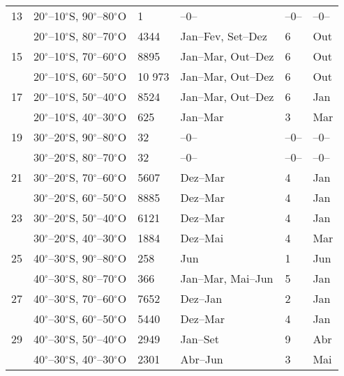 \begin{table}[!ht]
\begin{tabularx}{\textwidth}{p{0.6cm} p{3.5cm} W W W W}
13&20$^{\circ}$--10$^{\circ}$S, 90$^{\circ}$--80$^{\circ}$O& 1  &   --0--  & --0-- & --0-- \\[1.5pt]&20$^{\circ}$--10$^{\circ}$S, 80$^{\circ}$--70$^{\circ}$O& 4344 & Jan--Fev,  Set--Dez  &6& Out\\[1.5pt]
15&20$^{\circ}$--10$^{\circ}$S, 70$^{\circ}$--60$^{\circ}$O& 8895 & Jan--Mar, Out--Dez &6& Out\\[1.5pt]&20$^{\circ}$--10$^{\circ}$S, 60$^{\circ}$--50$^{\circ}$O& 10 973 & Jan--Mar,  Out--Dez &6& Out\\[1.5pt]
17&20$^{\circ}$--10$^{\circ}$S, 50$^{\circ}$--40$^{\circ}$O& 8524 & Jan--Mar, Out--Dez &6&  Jan\\[1.5pt]&20$^{\circ}$--10$^{\circ}$S, 40$^{\circ}$--30$^{\circ}$O& 625  & Jan--Mar &3&  Mar\\[1.5pt]

19&30$^{\circ}$--20$^{\circ}$S, 90$^{\circ}$--80$^{\circ}$O& 32 & --0-- & --0-- &  --0-- \\[1.5pt]&30$^{\circ}$--20$^{\circ}$S, 80$^{\circ}$--70$^{\circ}$O& 32 & --0-- &--0--&  --0--\\[1.5pt]
21&30$^{\circ}$--20$^{\circ}$S, 70$^{\circ}$--60$^{\circ}$O& 5607 & Dez--Mar &4& Jan\\[1.5pt]&30$^{\circ}$--20$^{\circ}$S, 60$^{\circ}$--50$^{\circ}$O& 8885  & Dez--Mar &4& Jan\\[1.5pt]
23&30$^{\circ}$--20$^{\circ}$S, 50$^{\circ}$--40$^{\circ}$O& 6121 & Dez--Mar &4& Jan\\[1.5pt]&30$^{\circ}$--20$^{\circ}$S, 40$^{\circ}$--30$^{\circ}$O& 1884 & Dez--Mai&4&  Mar\\[1.5pt]

25&40$^{\circ}$--30$^{\circ}$S, 90$^{\circ}$--80$^{\circ}$O& 258 & Jun &1&  Jun \\[1.5pt]&40$^{\circ}$--30$^{\circ}$S, 80$^{\circ}$--70$^{\circ}$O& 366 & Jan--Mar, Mai--Jun &5& Jan \\[1.5pt]
27&40$^{\circ}$--30$^{\circ}$S, 70$^{\circ}$--60$^{\circ}$O& 7652 & Dez--Jan &2&  Jan\\[1.5pt]&40$^{\circ}$--30$^{\circ}$S, 60$^{\circ}$--50$^{\circ}$O& 5440 & Dez--Mar  &4&  Jan\\[1.5pt]
29&40$^{\circ}$--30$^{\circ}$S, 50$^{\circ}$--40$^{\circ}$O& 2949 & Jan--Set &9&  Abr\\[1.5pt]&40$^{\circ}$--30$^{\circ}$S, 40$^{\circ}$--30$^{\circ}$O& 2301 & Abr--Jun  &3& Mai\\[1.5pt]


\hline 
\end{tabularx}
\end{table}

